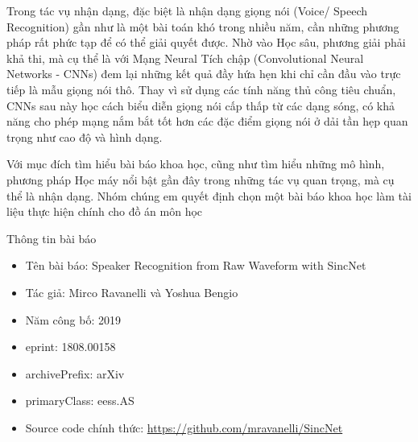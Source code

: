 \documentclass{article}
\begin{document}
	Trong tác vụ nhận dạng, đặc biệt là nhận dạng giọng nói (Voice/ Speech Recognition) gần như là một bài toán khó trong nhiều năm, cần những phương pháp rất phức tạp để có thể giải quyết được. Nhờ vào Học sâu, phương giải phải khả thi, mà cụ thể là với Mạng Neural Tích chập (Convolutional Neural Networks - CNNs) đem lại những kết quả đầy hứa hẹn khi chỉ cần đầu vào trực tiếp là mẫu giọng nói thô. Thay vì sử dụng các tính năng thủ công tiêu chuẩn, CNNs sau này học cách biểu diễn giọng nói cấp thấp từ các dạng sóng, có khả năng cho phép mạng nắm bắt tốt hơn các đặc điểm giọng nói ở dải tần hẹp quan trọng như cao độ và hình dạng.
	
	Với mục đích tìm hiểu bài báo khoa học, cũng như tìm hiểu những mô hình, phương pháp Học máy nổi bật gần đây trong những tác vụ quan trọng, mà cụ thể là nhận dạng. Nhóm chúng em quyết định chọn một bài báo khoa học làm tài liệu thực hiện chính cho đồ án môn học
	
	Thông tin bài báo
	\begin{itemize}
		\item Tên bài báo: Speaker Recognition from Raw Waveform with SincNet
		
		\item Tác giả: Mirco Ravanelli và Yoshua Bengio
		
		\item Năm công bố: 2019
		
		\item eprint: 1808.00158
		
		\item archivePrefix: arXiv
		
		\item primaryClass: eess.AS
		
		\item Source code chính thức: \href{https://github.com/mravanelli/SincNet}{https://github.com/mravanelli/SincNet}
	\end{itemize}
\end{document}
